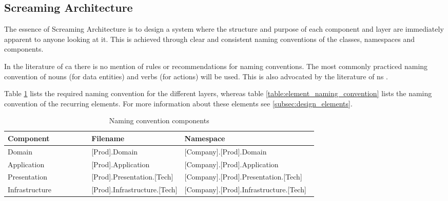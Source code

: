 \subsection{Screaming Architecture}
The essence of Screaming Architecture is to design a system where the structure and
purpose of each component and layer are immediately apparent to anyone looking at it. This
is achieved through clear and consistent naming conventions of the classes, namespaces and
components.

In the literature of \gls{ca} there is no mention of rules or recommendations for naming
conventions. The most commonly practiced naming convention of nouns (for data entities)
and verbs (for actions) will be used. This is also advocated by the literature of \gls{ns}
\parencite[357]{mannaert_normalized_2016}.

Table \ref{table:component_naming_convention} lists the required naming convention for the
different layers, whereas table \ref{table:element_naming_convention} lists the naming
convention of the recurring elements. For more information about these elements see
\ref{subsec:design_elements}.

\begin{table}[h]
    \small
    \begin{tabular}{ l p{0.30\linewidth} p{0.43\linewidth} }
    \hline
    \textbf{Component} & \textbf{Filename} & \textbf{Namespace} \\ 
    \hline
    Domain & [Prod].Domain & [Company].[Prod].Domain \\
    \hline
    Application & [Prod].Application & [Company].[Prod].Application \\
    \hline
    Presentation & [Prod].Presentation.[Tech] & [Company].[Prod].Presentation.[Tech] \\
    \hline
    Infrastructure & [Prod].Infrastructure.[Tech] & [Company].[Prod].Infrastructure.[Tech] \\
    \hline
    \end{tabular}
\caption{Naming convention components}
\label{table:component_naming_convention}
\end{table}

